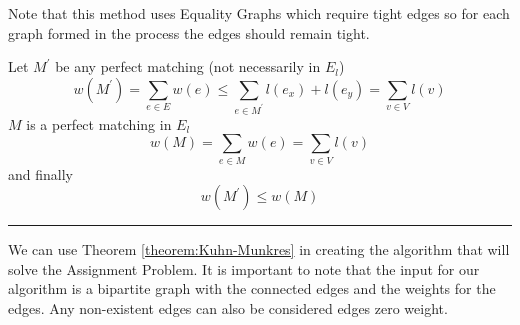 \documentclass[twoside]{article}
\newenvironment{proof}{{\bf Proof:}}{\hfill\rule{2mm}{2mm}}
\begin{document}
Note that this method uses Equality Graphs which require tight edges so for each graph formed in the process the edges should remain tight.

\begin{proof} \label{proof:kuhn-munkres}
Let $M^\prime$ be any perfect matching (not necessarily in $E_{l}$)
$$ w(M^\prime) = \sum_{e\in E}w(e) \leq \sum_{e\in M^\prime}l(e_{x}) + l(e_{y}) = \sum_{v \in V} l(v) $$
$M$ is a perfect matching in $E_{l}$
$$ w(M) = \sum_{e\in M} w(e) = \sum_{v\in V}l(v) $$
and finally
$$ w(M^\prime) \leq w(M) $$
\end{proof}

We can use Theorem \ref{theorem:Kuhn-Munkres} in creating the algorithm that will solve the Assignment Problem. It is important to note that the input for our algorithm is a bipartite graph with the connected edges and the weights for the edges. Any non-existent edges can also be considered edges zero weight.
\end{document}
